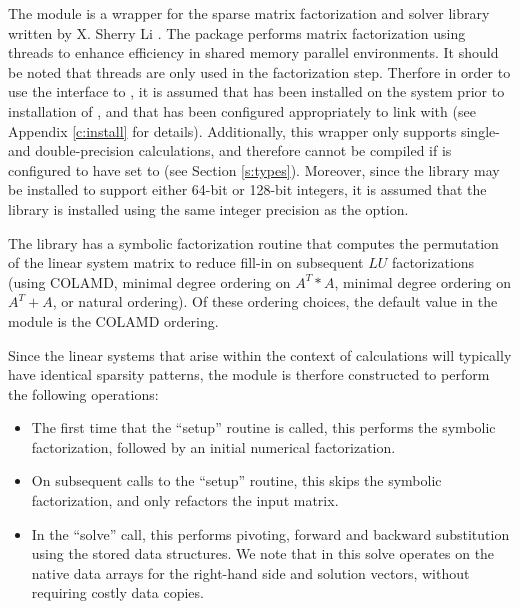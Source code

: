 {\warn} The {\sunlinsolslumt} module is a {\sunlinsol} wrapper for
the {\superlumt} sparse matrix factorization and solver library
written by X. Sherry Li \cite{SuperLUMT_site,Li:05,DGL:99}.  The
package performs matrix factorization using threads to enhance
efficiency in shared memory parallel environments.  It should be noted
that threads are only used in the factorization step.  Therfore in
order to use the {\sunlinsolslumt} interface to {\superlumt}, it is
assumed that {\superlumt} has been installed on the system prior to
installation of {\sundials}, and that {\sundials} has been configured
appropriately to link with {\superlumt} (see Appendix \ref{c:install}
for details).  Additionally, this wrapper only supports single- and
double-precision calculations, and therefore cannot be compiled if
{\sundials} is configured to have  set to 
(see Section \ref{s:types}).  Moreover, since the {\superlumt} library
may be installed to support either 64-bit or 128-bit integers, it is
assumed that the {\superlumt} library is installed using the same
integer precision as the {\sundials}  option.

The {\superlumt} library has a symbolic factorization routine that
computes the permutation of the linear system matrix to reduce fill-in
on subsequent $LU$ factorizations (using COLAMD, minimal degree
ordering on $A^T*A$, minimal degree ordering on $A^T+A$, or natural
ordering).  Of these ordering choices, the default value in the
{\sunlinsolslumt} module is the COLAMD ordering. 

Since the linear systems that arise within the context of {\sundials}
calculations will typically have identical sparsity patterns, the
{\sunlinsolslumt} module is therfore constructed to perform the
following operations:
\begin{itemize}
\item The first time that the ``setup'' routine is called, this
  performs the symbolic factorization, followed by an initial
  numerical factorization.  
\item On subsequent calls to the ``setup'' routine, this skips the
  symbolic factorization, and only refactors the input matrix.
\item In the ``solve'' call, this performs pivoting, forward and
  backward substitution using the stored {\superlumt} data
  structures.  We note that in this solve {\superlumt} operates on the
  native data arrays for the right-hand side and solution vectors,
  without requiring costly data copies.
\end{itemize}


